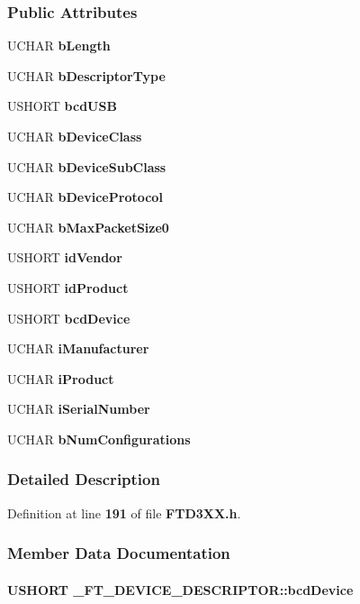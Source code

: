 \subsubsection*{Public Attributes}
\begin{DoxyCompactItemize}
\item 
U\+C\+H\+AR {\bf b\+Length}
\item 
U\+C\+H\+AR {\bf b\+Descriptor\+Type}
\item 
U\+S\+H\+O\+RT {\bf bcd\+U\+SB}
\item 
U\+C\+H\+AR {\bf b\+Device\+Class}
\item 
U\+C\+H\+AR {\bf b\+Device\+Sub\+Class}
\item 
U\+C\+H\+AR {\bf b\+Device\+Protocol}
\item 
U\+C\+H\+AR {\bf b\+Max\+Packet\+Size0}
\item 
U\+S\+H\+O\+RT {\bf id\+Vendor}
\item 
U\+S\+H\+O\+RT {\bf id\+Product}
\item 
U\+S\+H\+O\+RT {\bf bcd\+Device}
\item 
U\+C\+H\+AR {\bf i\+Manufacturer}
\item 
U\+C\+H\+AR {\bf i\+Product}
\item 
U\+C\+H\+AR {\bf i\+Serial\+Number}
\item 
U\+C\+H\+AR {\bf b\+Num\+Configurations}
\end{DoxyCompactItemize}


\subsubsection{Detailed Description}


Definition at line {\bf 191} of file {\bf F\+T\+D3\+X\+X.\+h}.



\subsubsection{Member Data Documentation}
\paragraph[{bcd\+Device}]{\setlength{\rightskip}{0pt plus 5cm}U\+S\+H\+O\+RT \+\_\+\+F\+T\+\_\+\+D\+E\+V\+I\+C\+E\+\_\+\+D\+E\+S\+C\+R\+I\+P\+T\+O\+R\+::bcd\+Device}\label{struct__FT__DEVICE__DESCRIPTOR_a1792376e2317ff1ad4db84075182c2e4}


